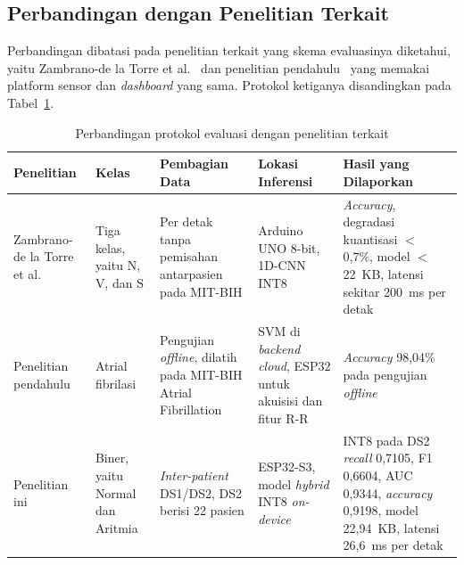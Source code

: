 \subsection{Perbandingan dengan Penelitian Terkait}

Perbandingan dibatasi pada penelitian terkait yang skema evaluasinya diketahui, yaitu Zambrano-de la Torre et al.~\cite{zambrano_2026} dan penelitian pendahulu~\cite{mulyawan_2026} yang memakai platform sensor dan \textit{dashboard} yang sama. Protokol ketiganya disandingkan pada Tabel~\ref{tab:perbandingan-protokol}.

\begin{table}[!ht]
  \centering
  \caption{Perbandingan protokol evaluasi dengan penelitian terkait}
  \label{tab:perbandingan-protokol}
  \setlength{\tabcolsep}{3pt}
  \renewcommand{\arraystretch}{1.15}
  \small
  \begin{tabular}{>{\RaggedRight\arraybackslash}p{2.35cm}>{\RaggedRight\arraybackslash}p{2.0cm}>{\RaggedRight\arraybackslash}p{2.5cm}>{\RaggedRight\arraybackslash}p{2.4cm}>{\RaggedRight\arraybackslash}p{3.45cm}}
    \toprule
    \textbf{Penelitian} & \textbf{Kelas} & \textbf{Pembagian Data} & \textbf{Lokasi Inferensi} & \textbf{Hasil yang Dilaporkan} \\
    \midrule
    Zambrano-de la Torre et al.~\cite{zambrano_2026} &
    Tiga kelas, yaitu N, V, dan S &
    Per detak tanpa pemisahan antarpasien pada MIT-BIH &
    Arduino UNO 8-bit, 1D-CNN INT8 &
    \textit{Accuracy}, degradasi kuantisasi $<$ 0,7\%, model $<$ 22~KB, latensi sekitar 200~ms per detak \\
    Penelitian pendahulu~\cite{mulyawan_2026} &
    Atrial fibrilasi &
    Pengujian \textit{offline}, dilatih pada MIT-BIH Atrial Fibrillation &
    SVM di \textit{backend cloud}, ESP32 untuk akuisisi dan fitur R-R &
    \textit{Accuracy} 98,04\% pada pengujian \textit{offline} \\
    Penelitian ini &
    Biner, yaitu Normal dan Aritmia &
    \textit{Inter-patient} DS1/DS2, DS2 berisi 22 pasien &
    ESP32-S3, model \textit{hybrid} INT8 \textit{on-device} &
    INT8 pada DS2 \textit{recall} 0,7105, F1 0,6604, AUC 0,9344, \textit{accuracy} 0,9198, model 22,94~KB, latensi 26,6~ms per detak \\
    \bottomrule
  \end{tabular}
\end{table}

